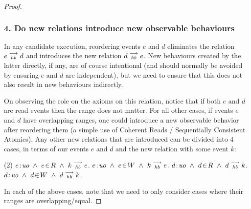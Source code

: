 \begin{proof}
    \subsubsection{4. Do new relations introduce new observable behaviours}
        In any candidate execution, reordering events $e$ and $d$ eliminates the relation $e\stackrel{\longrightarrow}{_{\textit{hb}}}d$ and introduces the new relation $d\stackrel{\longrightarrow}{_{\textit{hb}}}e$.  New behaviours created by the latter directly, if any, are 
        of course intentional (and should normally be avoided by ensuring $e$ and $d$ are independent), but we need to ensure that this does not also result in new behaviours indirectly.

        On observing the role on the axioms on this relation, notice that if both $e$ and $d$ are read events then the range does not matter. For all other cases, if events $e$ and $d$ have overlapping ranges, one could introduce a new observable behavior after reordering them (a simple use of Coherent Reads / Sequentially Consistent Atomics).        
        Any other new relations that are introduced can be divided into 4 cases, in terms of our events $e$ and $d$ and the new relation with some event $k$:
        \begin{tasks}(2)
            \task  $\et{e}{uo} \ \wedge \ \event{e}{R} \ \wedge \ \reln{k}{hb}{e}$.
            \task  $e\!:\!\textit{uo} \ \wedge \  e\!\in\!W \ \wedge \ k\stackrel{\longrightarrow}{_{\textit{hb}}}e$.
            \task  $\et{d}{uo} \ \wedge \  \event{d}{R} \ \wedge \ \reln{d}{hb}{k}$.
            \task  $d\!:\!\textit{uo} \ \wedge \ d\!\in\!W \ \wedge \ d\stackrel{\longrightarrow}{_{\textit{hb}}}k$.
        \end{tasks}
        In each of the above cases, note that we need to only consider cases where their ranges are overlapping/equal.
        

\end{proof}
